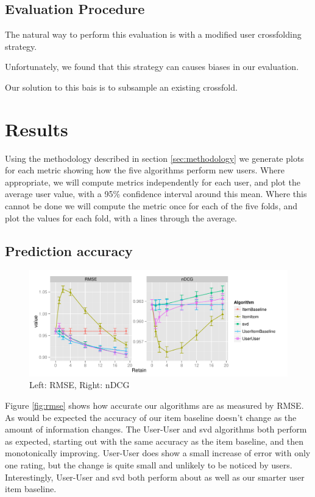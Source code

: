 \documentclass[letterpaper]{sig-alternate}
\begin{document}
  \subsection*{Evaluation Procedure}
  The natural way to perform this evaluation is with a modified user crossfolding strategy.
  
  Unfortunately, we found that this strategy can causes biases in our evaluation.
  
  Our solution to this bais is to subsample an existing crossfold.

\section{Results}

  Using the methodology described in section \ref{sec:methodology} we generate plots for each metric showing how the five algorithms perform new users.
  Where appropriate, we will compute metrics independently for each user, and plot the average user value, with a 95\% confidence interval around this mean.
  Where this cannot be done we will compute the metric once for each of the five folds, and plot the values for each fold, with a lines through the average.

\subsection{Prediction accuracy}
\begin{figure}
  \centering

  \includegraphics[width=\linewidth]{../lenskit/output/ekstrandTuned20/accuracy.pdf}
  \caption{Left: RMSE, Right: nDCG}
  \label{fig:rmse}
  \label{fig:ndcg}
\end{figure}
  Figure \ref{fig:rmse} shows how accurate our algorithms are as measured by RMSE.
  As would be expected the accuracy of our item baseline doesn't change as the amount of information changes.
  The User-User and svd algorithms both perform as expected, starting out with the same accuracy as the item baseline, and then monotonically improving.
  User-User does show a small increase of error with only one rating, but the change is quite small and unlikely to be noticed by users.
  Interestingly, User-User and svd both perform about as well as our smarter user item baseline. %
\end{document}
